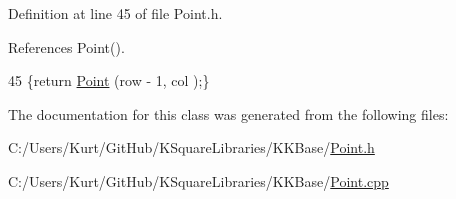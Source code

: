 Definition at line 45 of file Point.\+h.



References Point().


\begin{DoxyCode}
45 \{\textcolor{keywordflow}{return} \hyperlink{class_k_k_b_1_1_point_ad92f2337b839a94ce97dcdb439b4325a}{Point} (row - 1, col    );\}
\end{DoxyCode}


The documentation for this class was generated from the following files\+:\begin{DoxyCompactItemize}
\item 
C\+:/\+Users/\+Kurt/\+Git\+Hub/\+K\+Square\+Libraries/\+K\+K\+Base/\hyperlink{_point_8h}{Point.\+h}\item 
C\+:/\+Users/\+Kurt/\+Git\+Hub/\+K\+Square\+Libraries/\+K\+K\+Base/\hyperlink{_point_8cpp}{Point.\+cpp}\end{DoxyCompactItemize}
